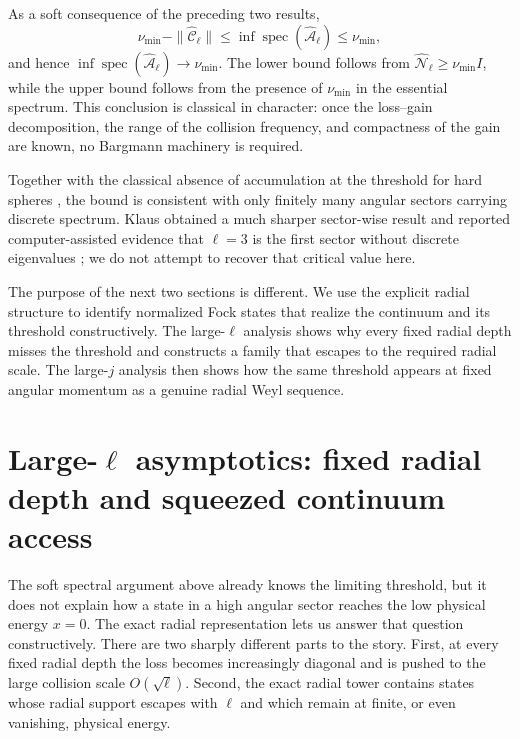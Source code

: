 \documentclass[11pt]{article}
\numberwithin{equation}{section}
\newcommand{\spec}{\operatorname{spec}}
\theoremstyle{definition}
\begin{document}
As a soft consequence of the preceding two results,
\begin{equation}
 \nu_{\min}-\|\widehat{\mathcal C}_\ell\|
 \le
 \inf\spec(\widehat{\mathcal A}_\ell)
 \le
 \nu_{\min},
 \label{eq:bottom_bounds_soft}
\end{equation}
and hence $\inf\spec(\widehat{\mathcal A}_\ell)\to\nu_{\min}$.  The lower bound follows
from $\widehat{\mathcal N}_\ell\ge\nu_{\min}I$, while the upper bound follows from
the presence of $\nu_{\min}$ in the essential spectrum.  This conclusion is
classical in character: once the loss--gain decomposition, the range of the
collision frequency, and compactness of the gain are known, no Bargmann
machinery is required.

Together with the classical absence of accumulation at the threshold for hard
spheres \cite{Dudynski2013}, the bound is consistent with only finitely many
angular sectors carrying discrete spectrum.  Klaus obtained a much sharper
sector-wise result and reported computer-assisted evidence that $\ell=3$ is
the first sector without discrete eigenvalues \cite{Klaus1976}; we do not
attempt to recover that critical value here.

The purpose of the next two sections is different.  We use the explicit radial
structure to identify normalized Fock states that realize the continuum and
its threshold constructively.  The large-$\ell$ analysis shows why every fixed
radial depth misses the threshold and constructs a family that escapes to the
required radial scale.  The large-$j$ analysis then shows how the same
threshold appears at fixed angular momentum as a genuine radial Weyl sequence.

\section{Large-\texorpdfstring{$\ell$}{l} asymptotics: fixed radial depth and squeezed continuum access}
\label{sec:large_l}

The soft spectral argument above already knows the limiting threshold, but it
does not explain how a state in a high angular sector reaches the low physical
energy $x=0$.  The exact radial representation lets us answer that question
constructively.  There are two sharply different parts to the story.  First,
at every fixed radial depth the loss becomes increasingly diagonal and is
pushed to the large collision scale $O(\sqrt\ell)$.  Second, the exact radial
tower contains states whose radial support escapes with $\ell$ and which
remain at finite, or even vanishing, physical energy.
\end{document}
